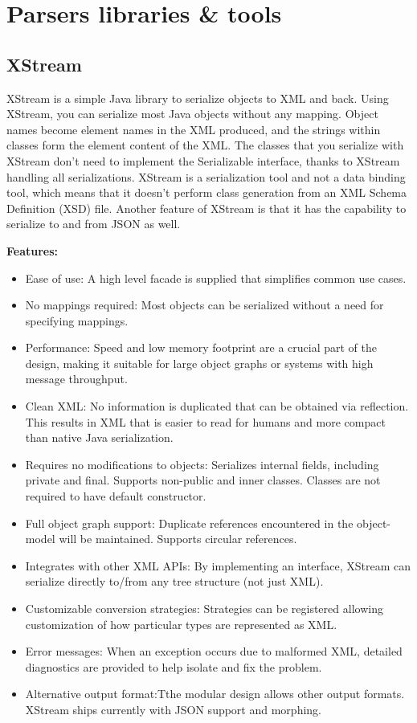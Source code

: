 \section{Parsers libraries \& tools}

\subsection{XStream}
XStream is a simple Java library to serialize objects to XML and back. Using XStream, you can serialize most Java objects without any mapping. Object names become element names in the XML produced, and the strings within classes form the element content of the XML.
\newline
\newline
The classes that you serialize with XStream don't need to implement the Serializable interface, thanks to XStream handling all serializations. XStream is a serialization tool and not a data binding tool, which means that it doesn't perform class generation from an XML Schema Definition (XSD) file.
\newline
\newline
Another feature of XStream is that it has the capability to serialize to and from JSON as well.

\textbf{Features:}
\begin{itemize}
\item{}Ease of use: A high level facade is supplied that simplifies common use cases.
\item{}No mappings required: Most objects can be serialized without a need for specifying mappings.
\item{}Performance: Speed and low memory footprint are a crucial part of the design, making it suitable for large object graphs or systems with high message throughput.
\item{}Clean XML: No information is duplicated that can be obtained via reflection. This results in XML that is easier to read for humans and more compact than native Java serialization.
\item{}Requires no modifications to objects: Serializes internal fields, including private and final. Supports non-public and inner classes. Classes are not required to have default constructor.
\item{}Full object graph support: Duplicate references encountered in the object-model will be maintained. Supports circular references.
\item{}Integrates with other XML APIs: By implementing an interface, XStream can serialize directly to/from any tree structure (not just XML).
\item{}Customizable conversion strategies: Strategies can be registered allowing customization of how particular types are represented as XML.
\item{}Error messages: When an exception occurs due to malformed XML, detailed diagnostics are provided to help isolate and fix the problem.
\item{}Alternative output format:Tthe modular design allows other output formats. XStream ships currently with JSON support and morphing.
\end{itemize}

